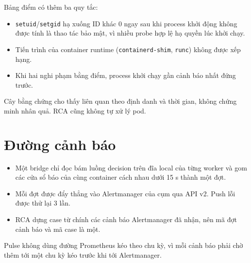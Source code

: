 Bảng điểm có thêm ba quy tắc:

\begin{itemize}
\tightlist
\item
  \texttt{setuid}/\texttt{setgid} hạ xuống ID khác 0 ngay sau khi process khởi động không được tính là thao tác bảo mật, vì nhiều probe hợp lệ hạ quyền lúc khởi chạy.
\item
  Tiến trình của container runtime (\texttt{containerd-\allowbreak{}shim}, \texttt{runc}) không được xếp hạng.
\item
  Khi hai nghi phạm bằng điểm, process khởi chạy gần cảnh báo nhất đứng trước.
\end{itemize}

Cây bằng chứng cho thấy liên quan theo định danh và thời gian, không chứng minh nhân quả. RCA cũng không tự xử lý pod.

\section{Đường cảnh báo}

\begin{itemize}
\tightlist
\item
  Một bridge chỉ đọc bám luồng decision trên đĩa local của từng worker và gom các cửa sổ báo của cùng container cách nhau dưới 15 s thành một đợt.
\item
  Mỗi đợt được đẩy thẳng vào Alertmanager của cụm qua API v2. Push lỗi được thử lại 3 lần.
\item
  RCA dựng case từ chính các cảnh báo Alertmanager đã nhận, nên mã đợt cảnh báo và mã case là một.
\end{itemize}

Pulse không dùng đường Prometheus kéo theo chu kỳ, vì mỗi cảnh báo phải chờ thêm tới một chu kỳ kéo trước khi tới Alertmanager.
